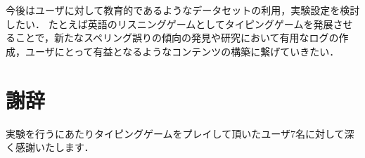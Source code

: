 \begin{comment}
タイピングゲームにおいて1文字入力するときの入力時間を記録しておくことでユーザがスペリング誤りを起こしていることを気付いて文字を打ち止めるときの文字と文字の間の境界をわかるようにするようにしたり，Babaらの研究\cite{babaACL2012}のようにバックスペースの入力をさせるようにしてスペリング誤りが修正されるものかそうでないかを明確にする必要があると考えられる．
\end{comment}

\begin{comment}
有用なログを抽出するために英単語以外にも英語の文章や日本語の単語，文章に対応するようなゲームの設計を行いたい．
\end{comment}

今後はユーザに対して教育的であるようなデータセットの利用，実験設定を検討したい．
たとえば英語のリスニングゲームとしてタイピングゲームを発展させることで，新たなスペリング誤りの傾向の発見や研究において有用なログの作成，ユーザにとって有益となるようなコンテンツの構築に繋げていきたい．

\newpage

\section*{\Large 謝辞}
実験を行うにあたりタイピングゲームをプレイして頂いたユーザ7名に対して深く感謝いたします．